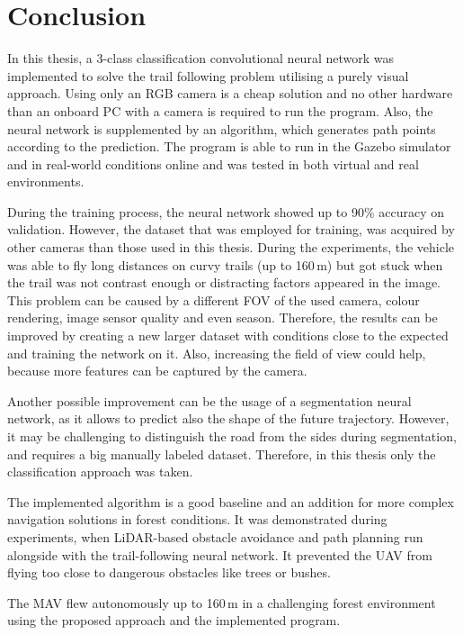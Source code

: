 \chapter{Conclusion}


In this thesis, a 3-class classification convolutional neural network was implemented to solve the trail following problem utilising a purely visual approach. Using only an RGB camera is a cheap solution and no other hardware than an onboard PC with a camera is required to run the program. Also, the neural network is supplemented by an algorithm, which generates path points according to the prediction. The program is able to run in the Gazebo simulator and in real-world conditions online and was tested in both virtual and real environments.

During the training process, the neural network showed up to 90\% accuracy on validation. However, the dataset that was employed for training, was acquired by other cameras than those used in this thesis. During the experiments, the vehicle was able to fly long distances on curvy trails (up to 160\,m) but got stuck when the trail was not contrast enough or distracting factors appeared in the image. This problem can be caused by a different \acs{FOV} of the used camera, colour rendering, image sensor quality and even season. Therefore, the results can be improved by creating a new larger dataset with conditions close to the expected and training the network on it. Also, increasing the field of view could help, because more features can be captured by the camera.

Another possible improvement can be the usage of a segmentation neural network, as it allows to predict also the shape of the future trajectory. However, it may be challenging to distinguish the road from the sides during segmentation, and requires a big manually labeled dataset. Therefore, in this thesis only the classification approach was taken.

The implemented algorithm is a good baseline and an addition for more complex navigation solutions in forest conditions. It was demonstrated during experiments, when \acs{LiDAR}-based obstacle avoidance and path planning run alongside with the trail-following neural network. It prevented the \acs{UAV} from flying too close to dangerous obstacles like trees or bushes.

The \acs{MAV} flew autonomously up to 160\,m in a challenging forest environment using the proposed approach and the implemented program.


